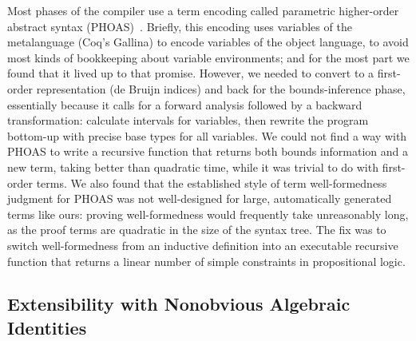 \documentclass[conference,letterpaper]{IEEEtran}
\begin{document}

Most phases of the compiler use a term encoding called parametric higher-order abstract syntax (PHOAS)~\cite{PHOAS}.
Briefly, this encoding uses variables of the metalanguage (Coq's Gallina) to encode variables of the object language, to avoid most kinds of bookkeeping about variable environments; and for the most part we found that it lived up to that promise.
However, we needed to convert to a first-order representation (de Bruijn indices) and back for the bounds-inference phase, essentially because it calls for a forward analysis followed by a backward transformation: calculate intervals for variables, then rewrite the program bottom-up with precise base types for all variables.
We could not find a way with PHOAS to write a recursive function that returns both bounds information and a new term, taking better than quadratic time, while it was trivial to do with first-order terms.
We also found that the established style of term well-formedness judgment for PHOAS was not well-designed for large, automatically generated terms like ours: proving well-formedness would frequently take unreasonably long, as the proof terms are quadratic in the size of the syntax tree.
The fix was to switch well-formedness from an inductive definition into an executable recursive function that returns a linear number of simple constraints in propositional logic.

\subsection{Extensibility with Nonobvious Algebraic Identities}
\end{document}

